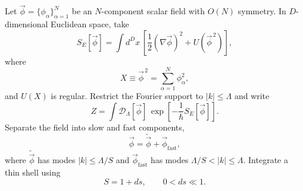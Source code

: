 Let $\vec\phi=\{\phi_\alpha\}_{\alpha=1}^{N}$ be an $N$-component scalar field
with $O(N)$ symmetry. In $D$-dimensional Euclidean space, take
\begin{equation}
    S_E[\vec\phi]
    =\int d^Dx\,
    \left[
        \frac{1}{2}(\nabla\vec\phi)^2
        +U(\vec\phi^{\,2})
    \right],
\end{equation}
where
\begin{equation}
    X\equiv\vec\phi^{\,2}
    =\sum_{\alpha=1}^{N}\phi_\alpha^2,
\end{equation}
and $U(X)$ is regular. Restrict the Fourier support to $|k|\leq\Lambda$ and
write
\begin{equation}
    Z
    =\int\mathcal D_\Lambda[\vec\phi]\,
    \exp\!\left[-\frac{1}{\hbar}S_E[\vec\phi]\right].
\end{equation}
Separate the field into slow and fast components,
\begin{equation}
    \vec\phi
    =\widetilde{\vec\phi}+\vec\phi_{\mathrm{fast}},
\end{equation}
where $\widetilde{\vec\phi}$ has modes $|k|\leq\Lambda/S$ and
$\vec\phi_{\mathrm{fast}}$ has modes $\Lambda/S<|k|\leq\Lambda$. Integrate a
thin shell using
\begin{equation}
    S=1+ds,
    \qquad
    0<ds\ll1.
\end{equation}

